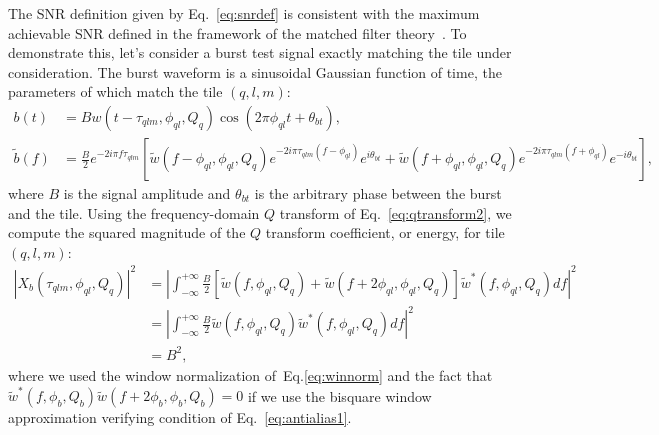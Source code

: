 \documentclass[aps]{revtex4-1}
\begin{document}
The SNR definition given by Eq.~\ref{eq:snrdef} is consistent with the maximum achievable SNR defined in the framework of the matched filter theory~\cite{helstrom:1968}. To demonstrate this, let's consider a burst test signal exactly matching the tile under consideration. The burst waveform is a sinusoidal Gaussian function of time, the parameters of which match the tile $(q,l,m)$:
\begin{align}
  b(t) &= Bw(t-\tau_{qlm}, \phi_{ql}, Q_q)\cos(2\pi\phi_{ql} t + \theta_{bt}), \label{eq:sg_wave}\\
  \tilde{b}(f) &= \frac{B}{2}e^{-2i\pi f\tau_{qlm}}\left[ \tilde{w}(f-\phi_{ql},\phi_{ql},Q_q)e^{-2i\pi\tau_{qlm}(f-\phi_{ql})}e^{i\theta_{bt}}+\tilde{w}(f+\phi_{ql},\phi_{ql},Q_q)e^{-2i\pi\tau_{qlm}(f+\phi_{ql})}e^{-i\theta_{bt}}\right],
\end{align}
where $B$ is the signal amplitude and $\theta_{bt}$ is the arbitrary phase between the burst and the tile. Using the frequency-domain $Q$ transform of Eq.~\ref{eq:qtransform2}, we compute the squared magnitude of the $Q$ transform coefficient, or energy, for tile $(q,l,m)$:
\begin{align}
  |X_b(\tau_{qlm}, \phi_{ql}, Q_q)|^2 &= \left|\int_{-\infty}^{+\infty}{ \frac{B}{2}\left[ \tilde{w}(f,\phi_{ql},Q_q)+\tilde{w}(f+2\phi_{ql},\phi_{ql},Q_q)\right] \tilde{w}^{*}(f,\phi_{ql},Q_q) df} \right|^2\\
  &= \left|\int_{-\infty}^{+\infty}{ \frac{B}{2} \tilde{w}(f,\phi_{ql},Q_q) \tilde{w}^{*}(f,\phi_{ql},Q_q) df}\right|^2 \\
  &= B^2,
  \label{eq:qtransform_signal}
\end{align}
where we used the window normalization of~Eq.\ref{eq:winnorm} and the fact that $\tilde{w}^{*}(f,\phi_b,Q_b)\tilde{w}(f+2\phi_b,\phi_b,Q_b)=0$ if we use the bisquare window approximation verifying condition of Eq.~\ref{eq:antialias1}.
\end{document}
